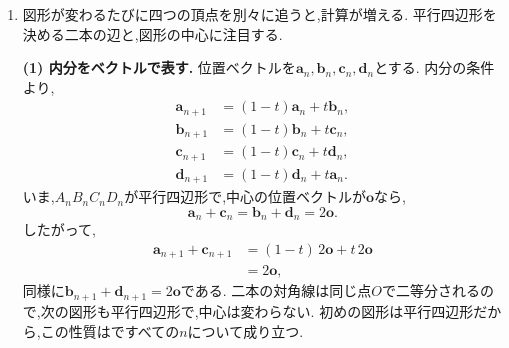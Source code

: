 \begin{enumerate}[label=\textbf{問\arabic*.},leftmargin=3.8em,format=\bookitemlink{practice-entrance}{solution}{problem}]
                  \smallskip\textbf{(3)~二項係数の恒等式.}
                  (1)から,
                  \[
                    c_kc_{n-k}=\frac1{4^n}\binom{2k}{k}
                                              \binom{2n-2k}{n-k}.
                  \]
                  $T_n=1$を$4^n$倍すれば設問の恒等式となる.
                  例えば$n=2$では$1\cdot6+2\cdot2+6\cdot1=16$である.
                  複雑な各項でも,和を一つのとして追うと簡単な性質が現れる.
          \item 図形が変わるたびに四つの頂点を別々に追うと,計算が増える.
                平行四辺形を決める二本の辺と,図形の中心に注目する.
                \par\noindent
                \textbf{(1) 内分をベクトルで表す.}
                位置ベクトルを$\boldsymbol a_n,\boldsymbol b_n,
                \boldsymbol c_n,\boldsymbol d_n$とする.
                内分の条件より,
                \[
                 \begin{aligned}
                 \boldsymbol a_{n+1}&=(1-t)\boldsymbol a_n+t\boldsymbol b_n,\\
                 \boldsymbol b_{n+1}&=(1-t)\boldsymbol b_n+t\boldsymbol c_n,\\
                 \boldsymbol c_{n+1}&=(1-t)\boldsymbol c_n+t\boldsymbol d_n,\\
                 \boldsymbol d_{n+1}&=(1-t)\boldsymbol d_n+t\boldsymbol a_n.
                 \end{aligned}
                \]
                いま,$A_nB_nC_nD_n$が平行四辺形で,中心の位置ベクトルが$\boldsymbol o$なら,
                \[
                 \boldsymbol a_n+\boldsymbol c_n
                 =\boldsymbol b_n+\boldsymbol d_n=2\boldsymbol o.
                \]
                したがって,
                \[
                 \begin{aligned}
                 \boldsymbol a_{n+1}+\boldsymbol c_{n+1}
                  &=(1-t)\,2\boldsymbol o+t\,2\boldsymbol o\\
                  &=2\boldsymbol o,
                 \end{aligned}
                \]
                同様に$\boldsymbol b_{n+1}+\boldsymbol d_{n+1}=2\boldsymbol o$である.
                二本の対角線は同じ点$O$で二等分されるので,次の図形も平行四辺形で,中心は変わらない.
                初めの図形は平行四辺形だから,この性質はですべての$n$について成り立つ.
                \par\noindent

\end{enumerate}
